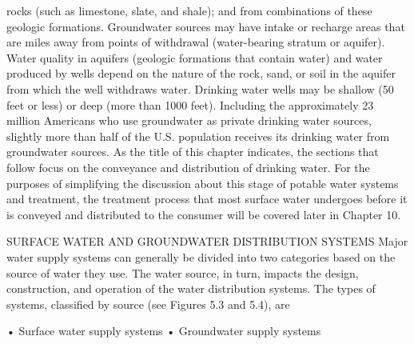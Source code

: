 \documentclass{article}
\begin{document}
rocks (such as limestone, slate, and shale); and from combinations of
these geologic formations. Groundwater sources may have intake or
recharge areas that are miles away from points of withdrawal
(water-bearing stratum or aquifer). Water quality in aquifers (geologic
formations that contain water) and water produced by wells depend on the
nature of the rock, sand, or soil in the aquifer from which the well
withdraws water. Drinking water wells may be shallow (50 feet or less)
or deep (more than 1000 feet). Including the approximately 23 million
Americans who use groundwater as private drinking water sources,
slightly more than half of the U.S. population receives its drinking
water from groundwater sources. As the title of this chapter indicates,
the sections that follow focus on the conveyance and distribution of
drinking water. For the purposes of simplifying the discussion about
this stage of potable water systems and treatment, the treatment process
that most surface water undergoes before it is conveyed and distributed
to the consumer will be covered later in Chapter 10.

SURFACE WATER AND GROUNDWATER DISTRIBUTION SYSTEMS Major water supply
systems can generally be divided into two categories based on the source
of water they use. The water source, in turn, impacts the design,
construction, and operation of the water distribution systems. The types
of systems, classified by source (see Figures 5.3 and 5.4), are

• Surface water supply systems • Groundwater supply systems
\end{document}
